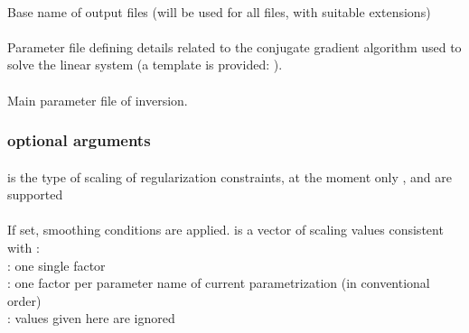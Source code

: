 \paragraph{}
Base name of output files (will be used for all files, with suitable extensions)
\paragraph{}
Parameter file defining details related to the conjugate gradient algorithm used to solve the linear system
(a template is provided: ).
\paragraph{}
Main parameter file of inversion.
\subsubsection{optional arguments}
\paragraph{}
 is the type of scaling of regularization constraints, at the moment only 
,  and  are supported
\paragraph{}
If set, smoothing conditions are applied.  is a vector of scaling values consistent 
with :\\
: one single factor\\
: one factor per parameter name of current parametrization (in conventional order)\\
 : values given here are ignored
